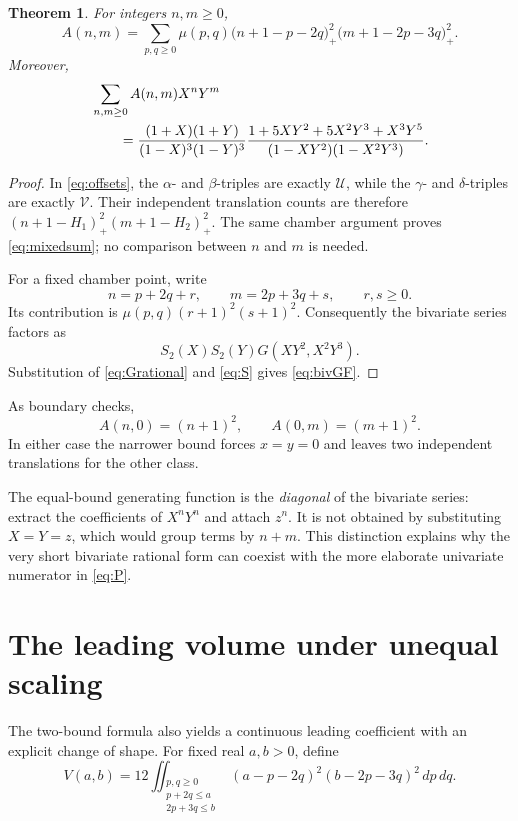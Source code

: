 \documentclass[11pt]{article}
\numberwithin{equation}{section}
\newtheorem{theorem}{Theorem}[section]
\theoremstyle{definition}
\begin{document}
\begin{theorem}\label{thm:twobound}
For integers $n,m\geq0$,
\begin{equation}\label{eq:mixedsum}
 A(n,m)=\sum_{p,q\geq0}\mu(p,q)
 \bigl(n+1-p-2q\bigr)_+^2
 \bigl(m+1-2p-3q\bigr)_+^2.
\end{equation}
Moreover,
\begin{align}\label{eq:bivGF}
 &\sum_{n,m\geq0}A(n,m)X^nY^m\notag\\
 &\qquad=\frac{(1+X)(1+Y)}{(1-X)^3(1-Y)^3}
 \frac{1+5XY^2+5X^2Y^3+X^3Y^5}
 {(1-XY^2)(1-X^2Y^3)}.
\end{align}
\end{theorem}

\begin{proof}
In \eqref{eq:offsets}, the $\alpha$- and $\beta$-triples are exactly
$\mathcal U$, while the $\gamma$- and $\delta$-triples are exactly
$\mathcal V$. Their independent translation counts are therefore
$(n+1-H_1)_+^2(m+1-H_2)_+^2$. The same chamber argument proves
\eqref{eq:mixedsum}; no comparison between $n$ and $m$ is needed.

For a fixed chamber point, write
\[
 n=p+2q+r,\qquad m=2p+3q+s,\qquad r,s\geq0.
\]
Its contribution is $\mu(p,q)(r+1)^2(s+1)^2$. Consequently the bivariate
series factors as
\[
 S_2(X)S_2(Y)G(XY^2,X^2Y^3).
\]
Substitution of \eqref{eq:Grational} and \eqref{eq:S} gives
\eqref{eq:bivGF}.
\end{proof}

As boundary checks,
\[
 A(n,0)=(n+1)^2,\qquad A(0,m)=(m+1)^2.
\]
In either case the narrower bound forces $x=y=0$ and leaves two independent
translations for the other class.

The equal-bound generating function is the \emph{diagonal} of the bivariate
series: extract the coefficients of $X^nY^n$ and attach $z^n$.
It is not obtained by substituting $X=Y=z$, which would group terms by
$n+m$. This distinction explains why the very short bivariate rational form
can coexist with the more elaborate univariate numerator in \eqref{eq:P}.

\section{The leading volume under unequal scaling}
\label{sec:volume}

The two-bound formula also yields a continuous leading coefficient with an
explicit change of shape. For fixed real $a,b>0$, define
\begin{equation}\label{eq:volumeintegral}
 V(a,b)=12\iint_{\substack{p,q\geq0\\p+2q\leq a\\2p+3q\leq b}}
 (a-p-2q)^2(b-2p-3q)^2\,dp\,dq.
\end{equation}
\end{document}
